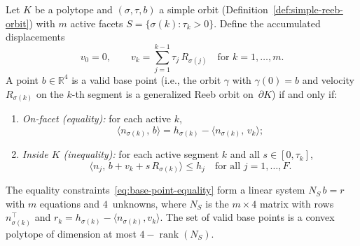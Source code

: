\begin{lemma}\label{lem:base-point-recovery}
Let $K$ be a polytope and $(\sigma, \tau, b)$ a simple orbit
(Definition~\ref{def:simple-reeb-orbit}) with $m$ active facets
$S = \{\sigma(k) : \tau_k > 0\}$.
Define the accumulated displacements
\[
  v_0 = 0, \qquad
  v_k = \sum_{j=1}^{k-1} \tau_j\, R_{\sigma(j)}
  \quad \text{for } k = 1, \ldots, m.
\]
A point $b \in \mathbb{R}^4$ is a valid base point
(i.e., the orbit $\gamma$ with $\gamma(0) = b$ and
velocity $R_{\sigma(k)}$ on the $k$-th segment
is a generalized Reeb orbit on~$\partial K$) if and only if:
\begin{enumerate}
\item \emph{On-facet (equality):}
  for each active $k$,
  \begin{equation}\label{eq:base-point-equality}
    \langle n_{\sigma(k)},\, b \rangle
    = h_{\sigma(k)} - \langle n_{\sigma(k)},\, v_k \rangle;
  \end{equation}
\item \emph{Inside $K$ (inequality):}
  for each active segment $k$ and all $s \in [0, \tau_k]$,
  \begin{equation}\label{eq:base-point-inequality}
    \langle n_j,\, b + v_k + s\, R_{\sigma(k)} \rangle
    \leq h_j
    \quad \text{for all } j = 1, \ldots, F.
  \end{equation}
\end{enumerate}
The equality constraints~\eqref{eq:base-point-equality} form
a linear system $N_S\, b = r$ with $m$ equations and $4$~unknowns,
where $N_S$ is the $m \times 4$ matrix with rows $n_{\sigma(k)}^\top$
and $r_k = h_{\sigma(k)} - \langle n_{\sigma(k)}, v_k \rangle$.
The set of valid base points is a convex polytope of
dimension at most $4 - \operatorname{rank}(N_S)$.
\end{lemma}

